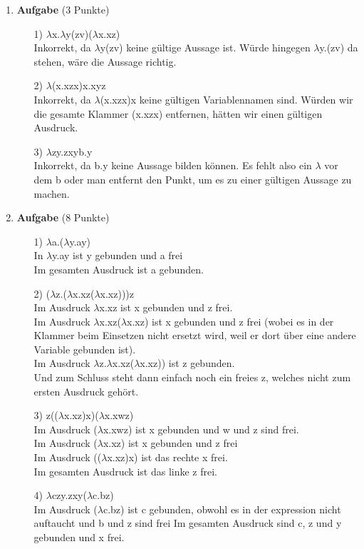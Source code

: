\documentclass[11pt]{article}
\newcommand{\punkte}[1]{{\small{ }(#1 Punkte)}}
\newcommand{\aufgabe}[1]{\item{\bf #1}}
\begin{document}
\begin{enumerate}
 \aufgabe{Aufgabe}\punkte{3}
\begin{enumerate}
\item[1)]$\lambda$x.$\lambda$y(zv)($\lambda$x.xz)\\
Inkorrekt, da $\lambda$y(zv) keine gültige Aussage ist. Würde hingegen $\lambda$y.(zv) da stehen, wäre die Aussage richtig.
\item[2)]$\lambda$(x.xzx)x.xyz\\
Inkorrekt, da $\lambda$(x.xzx)x keine gültigen Variablennamen sind. Würden wir die gesamte Klammer (x.xzx) entfernen, hätten wir einen gültigen Ausdruck.
\item[3)]$\lambda$zy.zxyb.y\\
Inkorrekt, da b.y keine Aussage bilden können. Es fehlt also ein $\lambda$ vor dem b oder man entfernt den Punkt, um es zu einer gültigen Aussage zu machen.
\end{enumerate}

 \aufgabe{Aufgabe}\punkte{8}
\begin{itemize}
\item[1)]$\lambda$a.($\lambda$y.ay)\\
In $\lambda$y.ay ist y gebunden und a frei\\
Im gesamten Ausdruck ist a gebunden.

\item[2)]($\lambda$z.($\lambda$x.xz($\lambda$x.xz)))z\\
Im Ausdruck $\lambda$x.xz ist x gebunden und z frei.\\
Im Ausdruck $\lambda$x.xz($\lambda$x.xz) ist x gebunden und z frei (wobei es in der Klammer beim Einsetzen nicht ersetzt wird, weil er dort über eine andere Variable gebunden ist).\\
Im Ausdruck $\lambda$z.$\lambda$x.xz($\lambda$x.xz)) ist z gebunden.\\
Und zum Schluss steht dann einfach noch ein freies z, welches nicht zum ersten Ausdruck gehört.

\item[3)]z(($\lambda$x.xz)x)($\lambda$x.xwz)\\
Im Ausdruck ($\lambda$x.xwz) ist x gebunden und w und z sind frei.\\
Im Ausdruck ($\lambda$x.xz) ist x gebunden und z frei\\
Im Ausdruck (($\lambda$x.xz)x) ist das rechte x frei.\\
Im gesamten Ausdruck ist das linke z frei.

\item[4)] $\lambda$czy.zxy($\lambda$c.bz)\\
Im Ausdruck ($\lambda$c.bz) ist c gebunden, obwohl es in der expression nicht auftaucht und b und z sind frei
Im gesamten Ausdruck sind c, z und y gebunden und x frei.
\end{itemize}


\end{enumerate}
\end{document}
